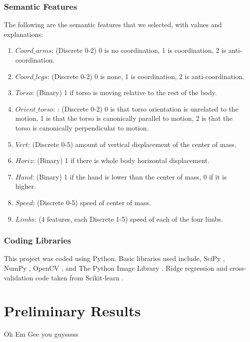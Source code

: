 \documentclass{article}
\begin{document}
\subsubsection{Semantic Features}
\label{sf}
The following are the semantic features that we selected, with values and explanations:
\begin{enumerate}
\item
$Coord\_arms$: (Discrete 0-2) 0 is no coordination, 1 is coordination, 2 is anti-coordination.
\item
$Coord\_legs$: (Discrete 0-2) 0 is none, 1 is coordination, 2 is anti-coordination.
\item
$Torso$: (Binary) 1 if torso is moving relative to the rest of the body.
\item
$Orient\_torso$: : (Discrete 0-2) 0 is that torso orientation is unrelated to the motion, 1 is that the torso is canonically parallel to motion, 2 is that the torso is canonically perpendicular to motion.
\item
$Vert$: (Discrete 0-5) amount of vertical displacement of the center of mass.
\item
$Horiz$: (Binary) 1 if there is whole body horizontal displacement.
\item
$Hand$: (Binary) 1 if the hand is lower than the center of mass, 0 if it is higher.
\item
$Speed$: (Discrete 0-5) speed of center of mass.
\item
$Limbs$: (4 features, each Discrete 1-5) speed of each of the four limbs.
\end{enumerate}
\subsubsection{Coding Libraries}
This project was coded using Python. Basic libraries used include, SciPy \cite{scipy}, NumPy \cite{numpy}, OpenCV \cite{opencv}, and The Python Image Library \cite{pil}. Ridge regression and cross-validation code taken from Scikit-learn \cite{scikit}.
\section{Preliminary Results} %
Oh Em Gee you guysssss
\end{document}
